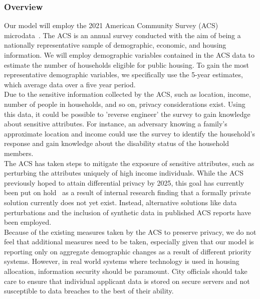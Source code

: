 \documentclass[11pt]{article}
\begin{document}
\subsubsection{Overview}Our model will employ the 2021 American Community Survey (ACS) microdata~\cite{us_census_bureau_mdat_nodate}. The ACS is an annual survey conducted with the aim of being a nationally representative sample of demographic, economic, and housing information. We will employ demographic variables contained in the ACS data to estimate the number of households eligible for public housing. To gain the most representative demographic variables, we specifically use the 5-year estimates, which average data over a five year period. \\
\newline
Due to the sensitive information collected by the ACS, such as location, income, number of people in households, and so on, privacy considerations exist. Using this data, it could be possible to 'reverse engineer' the survey to gain knowledge about sensitive attributes. For instance, an adversary knowing a family's approximate location and income could use the survey to identify the household's response and gain knowledge about the disability status of the household members. \\
\newline
The ACS has taken steps to mitigate the exposure of sensitive attributes, such as perturbing the attributes uniquely of high income individuals. While the ACS previously hoped to attain differential privacy by 2025, this goal has currently been put on hold~\cite{donna_daily_disclosure_nodate} as a result of internal research finding that a formally private solution currently does not yet exist. Instead, alternative solutions like data perturbations and the inclusion of synthetic data in published ACS reports have been employed. \\
\newline
Because of the existing measures taken by the ACS to preserve privacy, we do not feel that additional measures need to be taken, especially given that our model is reporting only on aggregate demographic changes as a result of different priority systems. However, in real world systems where technology is used in housing allocation, information security should be paramount. City officials should take care to ensure that individual applicant data is stored on secure servers and not susceptible to data breaches to the best of their ability. 
\end{document}
